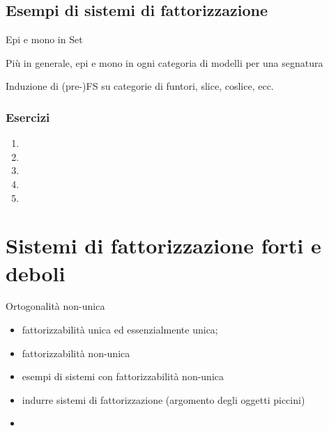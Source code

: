 \subsection{Esempi di sistemi di fattorizzazione}
\begin{example}
	Epi e mono in Set
\end{example}
Più in generale, epi e mono in ogni categoria di modelli per una segnatura
\begin{example}

\end{example}

\begin{example}

\end{example}

\begin{example}

\end{example}

\begin{example}

\end{example}

\begin{example}
	Induzione di (pre-)FS su categorie di funtori, slice, coslice, ecc.
\end{example}

\subsubsection*{Esercizi}
\begin{enumerate}
	\item
	\item
	\item
	\item
	\item
\end{enumerate}
\section[Fattorizzazione]{Sistemi di fattorizzazione forti e deboli}
Ortogonalità non-unica
\begin{itemize}
	\item fattorizzabilità unica ed essenzialmente unica;
	\item fattorizzabilità non-unica
	\item esempi di sistemi con fattorizzabilità non-unica
	\item indurre sistemi di fattorizzazione (argomento degli oggetti piccini)
	\item
\end{itemize}
